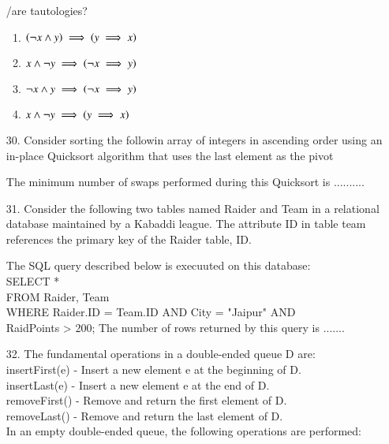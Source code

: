 \documentclass[journal]{IEEEtran}
\begin{document}
\begin{enumerate}
    /are tautologies?
    \begin{enumerate}[label = (\Alph*)]
        \item $\left(\neg x \land y\right)\implies \left(y\implies x\right) $
        \item ${ x \land \neg y}\implies \left(\neg x \implies y\right) $
        \item ${\neg x \land y}\implies \left(\neg x \implies y\right) $
        \item ${ x \land\neg y}\implies \left(y\implies x\right) $
    \end{enumerate}
    \item[30.] Consider sorting the followin array of integers in ascending order using an in-place Quicksort algorithm that uses the last element as the pivot 
    \begin{table}
        \centering
        
    \end{table}
    The minimum number of swaps performed during this Quicksort is ..........
    \item[31.] Consider the following two tables named Raider and Team in a relational database maintained by a Kabaddi league. The attribute ID in table team references the primary key of the Raider table, ID. 
    \begin{table}
        \centering
        
    \end{table}
    \begin{table}
        \centering
        
    \end{table}
    The SQL query described below is execuuted on this database:\\
    SELECT *\\
    FROM Raider, Team\\
    WHERE Raider.ID = Team.ID AND City = "Jaipur" AND \\
    RaidPoints > 200;
    The number of rows returned by this query is ....... 
    \item[32.] The fundamental operations in a double-ended queue D are:\\
    insertFirst(e) - Insert a new element e at the beginning of D.\\
    insertLast(e) - Insert a new element e at the end of D.\\
    removeFirst() - Remove and return the first element of D.\\
    removeLast() - Remove and return the last element of D.\\
    In an empty double-ended queue, the following operations are performed:\\

\end{enumerate}
\end{document}
